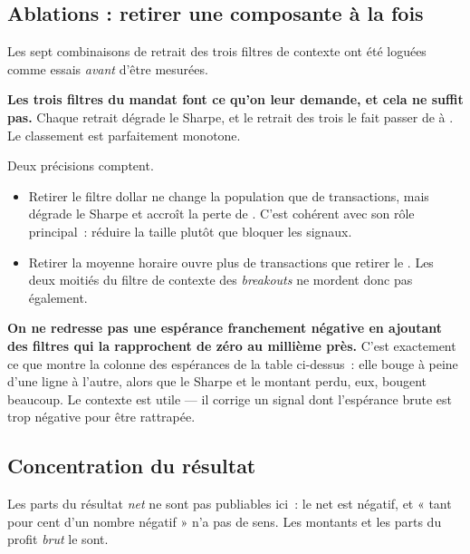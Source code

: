 \subsection{Ablations : retirer une composante à la fois}

Les sept combinaisons de retrait des trois filtres de contexte ont été
loguées comme essais \emph{avant} d'être mesurées.



\textbf{Les trois filtres du mandat font ce qu'on leur demande, et cela ne
suffit pas.} Chaque retrait dégrade le Sharpe, et le retrait des trois le fait
passer de \XTenSharpeIS{} à \XTenAblationAllOffSharpe. Le classement est
parfaitement monotone.

Deux précisions comptent.

\begin{itemize}
  \item Retirer le filtre dollar ne change la population que de
  \XTenDxyTradeDelta{} transactions, mais dégrade le Sharpe et accroît la perte
  de \XTenDxySavings. C'est cohérent avec son rôle principal~: réduire la
  taille plutôt que bloquer les signaux.
  \item Retirer la moyenne horaire ouvre plus de transactions que retirer le
  . Les deux moitiés du filtre de contexte des \emph{breakouts} ne
  mordent donc pas également.
\end{itemize}

\begin{insightbox}
\textbf{On ne redresse pas une espérance franchement négative en ajoutant des
filtres qui la rapprochent de zéro au millième près.} C'est exactement ce que
montre la colonne des espérances de la table ci-dessus~: elle bouge à peine
d'une ligne à l'autre, alors que le Sharpe et le montant perdu, eux, bougent
beaucoup. Le contexte est utile --- il corrige un signal dont l'espérance
brute est trop négative pour être rattrapée.
\end{insightbox}

\subsection{Concentration du résultat}



Les parts du résultat \emph{net} ne sont pas publiables ici~: le net est
négatif, et « tant pour cent d'un nombre négatif » n'a pas de sens. Les
montants et les parts du profit \emph{brut} le sont.

